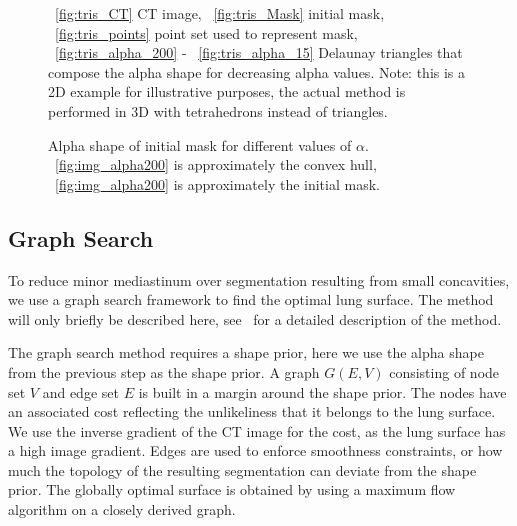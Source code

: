 \documentclass{llncs}
\begin{document}
\begin{figure}[ht!]
{  \label{fig:tris_alpha_50}
  }
  \caption{~\ref{fig:tris_CT} CT image, ~\ref{fig:tris_Mask} initial mask, ~\ref{fig:tris_points} point set used to represent mask, ~\ref{fig:tris_alpha_200} - ~\ref{fig:tris_alpha_15} Delaunay triangles that compose the alpha shape for decreasing alpha values. Note: this is a 2D example for illustrative purposes, the actual method is performed in 3D with tetrahedrons instead of triangles. }
  \label{fig:tris}
\end{figure}


\begin{figure}[t]
  \centering
  \caption{Alpha shape of initial mask for different values of $\alpha$. ~\ref{fig:img_alpha200} is approximately the convex hull, ~\ref{fig:img_alpha200} is approximately the initial mask.}
  \label{fig:alphashapes}
\end{figure}
%
\subsection{Graph Search}
%
To reduce minor mediastinum over segmentation resulting from small concavities, we use a graph search framework to find the optimal lung surface. The method will only briefly be described here, see~\cite{li2006} for a detailed description of the method. 

The graph search method requires a shape prior, here we use the alpha shape from the previous step as the shape prior. A graph $G(E,V)$ consisting of node set $V$ and edge set $E$ is built in a margin around the shape prior. The nodes have an associated cost reflecting the unlikeliness that it belongs to the lung surface. We use the inverse gradient of the CT image for the cost, as the lung surface has a high image gradient. Edges are used to enforce smoothness constraints, or how much the topology of the resulting segmentation can deviate from the shape prior. The globally optimal surface is obtained by using a maximum flow algorithm on a closely derived graph. 
\end{document}

